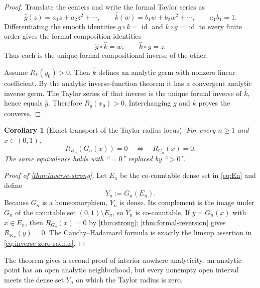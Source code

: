 \documentclass[11pt,oneside]{article}
\newtheorem{corollary}[theorem]{Corollary}
\theoremstyle{definition}
\theoremstyle{remark}
\newcommand{\id}{\operatorname{id}}
\newcommand{\comp}{\mathbin{\circ}}
\begin{document}
\begin{proof}
Translate the centers and write the formal Taylor series as
\[
 \widehat g(z)=a_1z+a_2z^2+\cdots,
 \qquad
 \widehat k(w)=b_1w+b_2w^2+\cdots,
 \qquad a_1b_1=1.
\]
Differentiating the smooth identities $g\comp k=\id$ and $k\comp g=\id$ to every
finite order gives the formal composition identities
\begin{equation}
 \widehat g\comp\widehat k=w,
 \qquad
 \widehat k\comp\widehat g=z.
 \label{eq:formal-inverse-identities}
\end{equation}
Thus each is the unique formal compositional inverse of the other.

Assume $R_k(y_0)>0$.  Then $\widehat k$ defines an analytic germ with nonzero linear
coefficient.  By the analytic inverse-function theorem it has a convergent analytic
inverse germ.  The Taylor series of that inverse is the unique formal inverse of
$\widehat k$, hence equals $\widehat g$.  Therefore $R_g(x_0)>0$.  Interchanging $g$
and $k$ proves the converse.
\end{proof}

\begin{corollary}[Exact transport of the Taylor-radius locus]
\label{cor:radius-transport}
For every $n\geq1$ and $x\in(0,1)$,
\begin{equation}
 R_{K_n}(G_n(x))=0\quad\Longleftrightarrow\quad R_{G_n}(x)=0.
 \label{eq:radius-transport}
\end{equation}
The same equivalence holds with ``$=0$'' replaced by ``$>0$''.
\end{corollary}

\begin{proof}[Proof of \cref{thm:inverse-strong}]
Let $E_n$ be the co-countable dense set in \eqref{eq:En} and define
\begin{equation}
 Y_n:=G_n(E_n).
 \label{eq:Yn}
\end{equation}
Because $G_n$ is a homeomorphism, $Y_n$ is dense.  Its complement is the image under
$G_n$ of the countable set $(0,1)\setminus E_n$, so $Y_n$ is co-countable.  If
$y=G_n(x)$ with $x\in E_n$, then $R_{G_n}(x)=0$ by \cref{thm:strong};
\cref{thm:formal-reversion} gives $R_{K_n}(y)=0$.  The Cauchy--Hadamard formula is
exactly the limsup assertion in \eqref{eq:inverse-zero-radius}.
\end{proof}

The theorem gives a second proof of interior nowhere analyticity: an analytic point has
an open analytic neighborhood, but every nonempty open interval meets the dense set
$Y_n$ on which the Taylor radius is zero.
\end{document}
